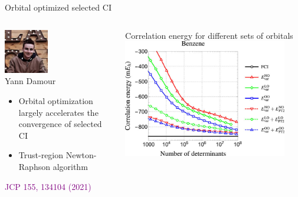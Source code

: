 \documentclass[aspectratio=169,9pt]{beamer}
\newcommand{\pub}[1]{{\small \textcolor{purple}{#1}}}
\begin{document}
\begin{frame}{Orbital optimized selected CI}

\begin{columns}

\begin{column}{0.5\textwidth}

\centering
\includegraphics[width=0.4\textwidth]{fig/Yann2.jpg}
\\
Yann Damour
\\

\begin{itemize}
	\item Orbital optimization largely accelerates the convergence of selected CI
                        \bigskip
	\item Trust-region Newton-Raphson algorithm
                        \bigskip
\end{itemize}
			\bigskip
                        \centering
			\pub{JCP 155, 134104 (2021)}
\end{column}

                \begin{column}{0.5\textwidth}
                        \centering
			\begin{block}{Correlation energy for different sets of orbitals}
                        \includegraphics[width=0.9\textwidth]{fig/oocipsi_benzene.jpeg}
                        \\
                        \bigskip
                        \end{block}
                \end{column}


\end{columns}
\end{frame}
\end{document}
